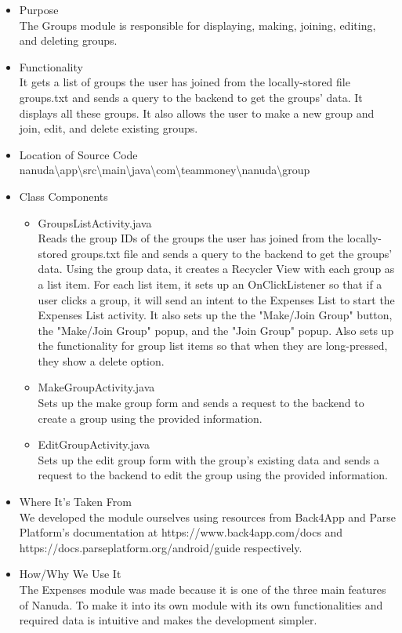 \documentclass[conference]{IEEEtran}
\begin{document}
\begin{itemize}
    \item Purpose \\ The Groups module is responsible for displaying, making, joining, editing, and deleting groups.
    \item Functionality \\ It gets a list of groups the user has joined from the locally-stored file groups.txt and sends a query to the backend to get the groups' data. It displays all these groups. It  also allows the user to make a new group and join, edit, and delete existing groups.
    \item Location of Source Code \\ nanuda\textbackslash{}app\textbackslash{}src\textbackslash{}main\textbackslash{}java\textbackslash{}com\textbackslash{}teammoney\textbackslash{}nanuda\textbackslash{}group
    \item Class Components
        \begin{itemize}
            \item GroupsListActivity.java \\ Reads the group IDs of the groups the user has joined from the locally-stored groups.txt file and sends a query to the backend to get the groups' data. Using the group data, it creates a Recycler View with each group as a list item. For each list item, it sets up an OnClickListener so that if a user clicks a group, it will send an intent to the Expenses List to start the Expenses List activity. It also sets up the the "Make/Join Group" button, the "Make/Join Group" popup, and the "Join Group" popup. Also sets up the functionality for group list items so that when they are long-pressed, they show a delete option.
            \item MakeGroupActivity.java \\ Sets up the make group form and sends a request to the backend to create a group using the provided information.
            \item EditGroupActivity.java \\ Sets up the edit group form with the group's existing data and sends a request to the backend to edit the group using the provided information.
        \end{itemize}
    \item Where It's Taken From \\ We developed the module ourselves using resources from Back4App and Parse Platform's documentation at https://www.back4app.com/docs and https://docs.parseplatform.org/android/guide respectively.
    \item How/Why We Use It \\ The Expenses module was made because it is one of the three main features of Nanuda. To make it into its own module with its own functionalities and required data is intuitive and makes the development simpler.
\end{itemize}
\end{document}
